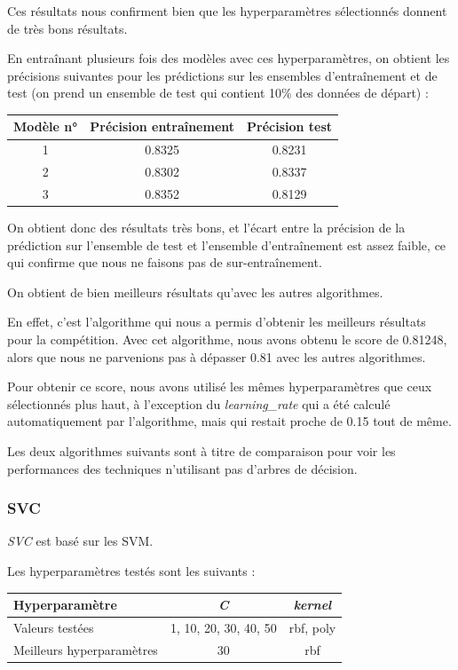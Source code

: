 \documentclass[a4paper]{article}
\begin{document}
    Ces résultats nous confirment bien que les hyperparamètres sélectionnés donnent de très bons résultats.

    En entraînant plusieurs fois des modèles avec ces hyperparamètres, on obtient les précisions suivantes pour les prédictions 
    sur les ensembles d'entraînement et de test (on prend un ensemble de test qui contient 10\% des données de départ) :

    \begin{tabular}{| *{3}{c|}}
        \hline
        Modèle n° & Précision entraînement & Précision test
        \tabularnewline
        \hline
        1 & 0.8325 & 0.8231
        \tabularnewline
        \hline
        2 & 0.8302 & 0.8337
        \tabularnewline
        \hline
        3 & 0.8352 & 0.8129
        \tabularnewline
        \hline
    \end{tabular}

    On obtient donc des résultats très bons, et l'écart entre la précision de la prédiction sur l'ensemble de test
    et l'ensemble d'entraînement est assez faible, ce qui confirme que nous ne faisons pas de sur-entraînement.

    On obtient de bien meilleurs résultats qu'avec les autres algorithmes.

    En effet, c'est l'algorithme qui nous a permis d'obtenir les meilleurs résultats pour la compétition.
    Avec cet algorithme, nous avons obtenu le score de 0.81248, alors que nous ne parvenions pas à dépasser 0.81
    avec les autres algorithmes.

    Pour obtenir ce score, nous avons utilisé les mêmes hyperparamètres que ceux sélectionnés plus haut, à l'exception
    du {\it learning\_rate} qui a été calculé automatiquement par l'algorithme, mais qui restait proche de 0.15 tout de même.

    Les deux algorithmes suivants sont à titre de comparaison pour voir les performances des techniques
    n'utilisant pas d'arbres de décision.

    \subsubsection{SVC}

    {\it SVC} est basé sur les SVM.

    Les hyperparamètres testés sont les suivants :

    \begin{tabular}{| l | *{2}{c|}}
        \hline
        Hyperparamètre & {\it C} & {\it kernel}
        \tabularnewline
        \hline
        Valeurs testées & 1, 10, 20, 30, 40, 50 & rbf, poly
        \tabularnewline
        \hline
        Meilleurs hyperparamètres & 30 & rbf
        \tabularnewline
        \hline
    \end{tabular}
\end{document}
